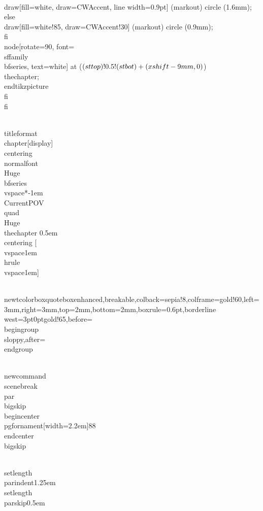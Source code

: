 {{            \\draw[fill=white, draw=CWAccent, line width=0.9pt] (markout) circle (1.6mm);
          \\else
            \\draw[fill=white!85, draw=CWAccent!30] (markout) circle (0.9mm);
          \\fi
        }
        \\node[rotate=90, font=\\sffamily\\bfseries, text=white] at ($(sttop)!0.5!(stbot)+(\\xshift-9mm,0)$) {\\thechapter};
      \\end{tikzpicture}%
    \\fi
  \\fi
}

\\titleformat{\\chapter}[display]
  {\\centering\\normalfont\\Huge\\bfseries}
  {\\vspace*{-1em}\\CurrentPOV\\quad\\Huge\\thechapter}
  {0.5em}
  {\\centering}
  [\\vspace{1em}\\hrule\\vspace{1em}]

\\newtcolorbox{quotebox}{enhanced,breakable,colback=sepia!8,colframe=gold!60,left=3mm,right=3mm,top=2mm,bottom=2mm,boxrule=0.6pt,borderline west={3pt}{0pt}{gold!65},before=\\begingroup\\sloppy,after=\\endgroup}

\\newcommand{\\scenebreak}{\\par\\bigskip\\begin{center}\\pgfornament[width=2.2em]{88}\\end{center}\\bigskip}

\\setlength{\\parindent}{1.25em}
\\setlength{\\parskip}{0.5em}


